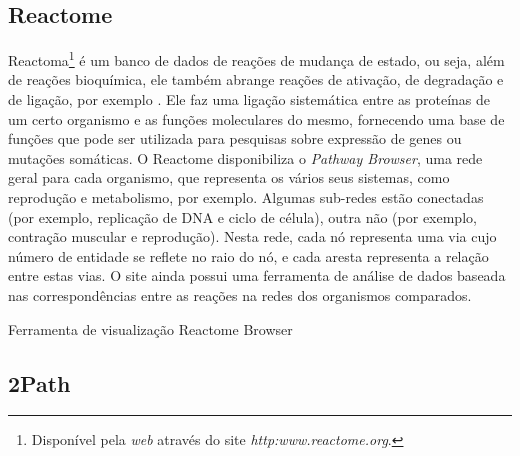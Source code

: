 \subsection{Reactome}

\indent Reactoma\footnote{Disponível pela \textit{web} através do site \textit{http:\/\/www.reactome.org}.} é um banco de dados de reações de mudança de estado, ou seja, além de reações bioquímica, ele também abrange reações de ativação, de degradação e de ligação, por exemplo \cite{reactomeUsersguide}. Ele faz uma ligação sistemática entre as proteínas de um certo organismo e as funções moleculares do mesmo, fornecendo uma base de funções que pode ser utilizada para pesquisas sobre expressão de genes ou mutações somáticas. O Reactome disponibiliza o \textit{Pathway Browser}, uma rede geral para cada organismo, que representa os vários seus sistemas, como reprodução e metabolismo, por exemplo. Algumas sub-redes estão conectadas (por exemplo, replicação de DNA e ciclo de célula), outra não (por exemplo, contração muscular e reprodução). Nesta rede, cada nó representa uma via cujo número de entidade se reflete no raio do nó, e cada aresta representa a relação entre estas vias. O site ainda possui uma ferramenta de análise de dados baseada nas correspondências entre as reações na redes dos organismos comparados.

\indent Ferramenta de visualização Reactome Browser




\subsection{2Path}


